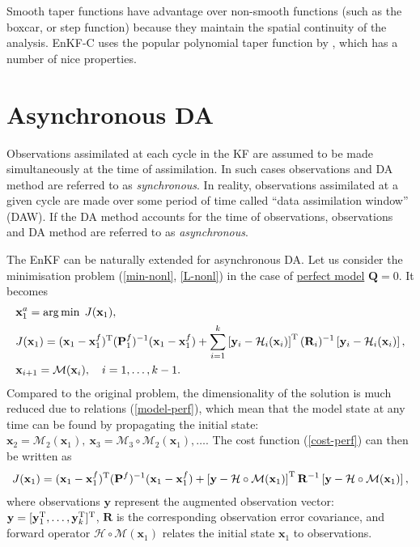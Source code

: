 \documentclass[11pt]{report}
\newcommand{\mb} {\mathbf}
\newcommand{\T}{^{\tiny \mathrm T}}
\begin{document}
Smooth taper functions have advantage over non-smooth functions (such as the boxcar, or step function) because they maintain the spatial continuity of the analysis.
EnKF-C uses the popular polynomial taper function by \citet{gas99a}, which has a number of nice properties.

\section{Asynchronous DA}

Observations assimilated at each cycle in the KF are assumed to be made simultaneously at the time of assimilation.
In such cases observations and DA method are referred to as \emph{synchronous}.
In reality, observations assimilated at a given cycle are made over some period of time called ``data assimilation window'' (DAW).
If the DA method accounts for the time of observations, observations and DA method are referred to as \emph{asynchronous}.

The EnKF can be naturally extended for asynchronous DA.
Let us consider the minimisation problem (\ref{min-nonl}, \ref{L-nonl}) in the case of \underline{perfect model} $\mb Q = 0$.
It becomes
\begin{align}
  \label{min-perf}
  &{\mb x_1^a} = \arg \min \; J(\mb x_1),\\
  \label{cost-perf}
  &J(\mb x_1)  = (\mb x_1 - \mb x_1^f)\T (\mb P_1^f)^{-1} (\mb x_1 - \mb x_1^f) + \sum_{i = 1}^k \left [ \mb y_i - \mathcal H_i(\mb x_i) \right ] \T (\mb R_i)^{-1} \left [ \mb y_i - \mathcal H_i(\mb x_i) \right ],\\
  \label{model-perf}
  &\mb x_{i+1} = \mathcal M(\mb x_i),\quad i = 1,\dots,k-1.
\end{align}
Compared to the original problem, the dimensionality of the solution is much reduced due to relations (\ref{model-perf}), which mean that the model state at any time can be found by propagating the initial state: $\mb x_2 = \mathcal M_2(\mb x_1),\ \mb x_3 = \mathcal M_3 \circ \mathcal M_2(\mb x_1), \dots$.
The cost function (\ref{cost-perf}) can then be written as
\begin{align}
  \label{cost-async}
  J(\mb x_1)  = (\mb x_1 - \mb x_1^f)\T (\mb P^f)^{-1} (\mb x_1 - \mb x_1^f) + \left [ \mb y - \mathcal H \circ \mathcal M(\mb x_1) \right ] \T \mb R^{-1} \left [ \mb y - \mathcal H\circ \mathcal M(\mb x_1) \right ],
\end{align}
where observations $\mb y$ represent the augmented observation vector: $\mb y = [\mb y_1\T,\dots,\mb y_k\T]\T$, $\mb R$ is the corresponding observation error covariance, and forward operator $\mathcal H \circ \mathcal M (\mb x_1)$ relates the initial state $\mb x_1$ to observations.
\end{document}
